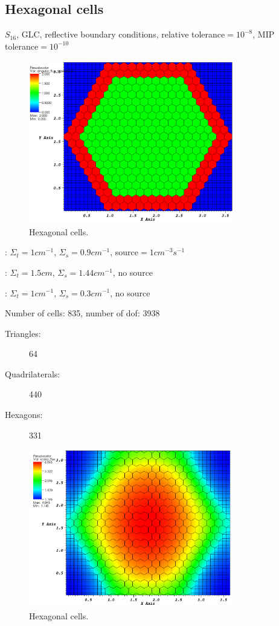 \subsection{Hexagonal cells}
$S_{16}$, GLC, reflective boundary conditions, relative tolerance$ = 10^{-8}$,
MIP tolerance$ = 10^{-10}$
\begin{description}
\begin{figure}[H]
\centering
\includegraphics[width=0.8\textwidth]{source_crop}
\caption{Hexagonal cells.}
\end{figure}
\item[Green zone]: $\Sigma_t =1cm^{-1}$, $\Sigma_s = 0.9cm^{-1}$, source$ =
1cm^{-3}s^{-1}$
\item[Red zone]: $\Sigma_t = 1.5cm$, $\Sigma_s = 1.44cm^{-1}$, no source
\item[Blue zone]: $\Sigma_t = 1cm^{-1}$, $\Sigma_s = 0.3cm^{-1}$, no source
\end{description}
Number of cells: 835, number of dof: 3938
\begin{description}
\item[Triangles:] 64
\item[Quadrilaterals:] 440
\item[Hexagons:] 331
\end{description}
\begin{figure}[H]
\centering
\includegraphics[width=0.8\textwidth]{heter_hexag_crop}
\caption{Hexagonal cells.}
\end{figure}
